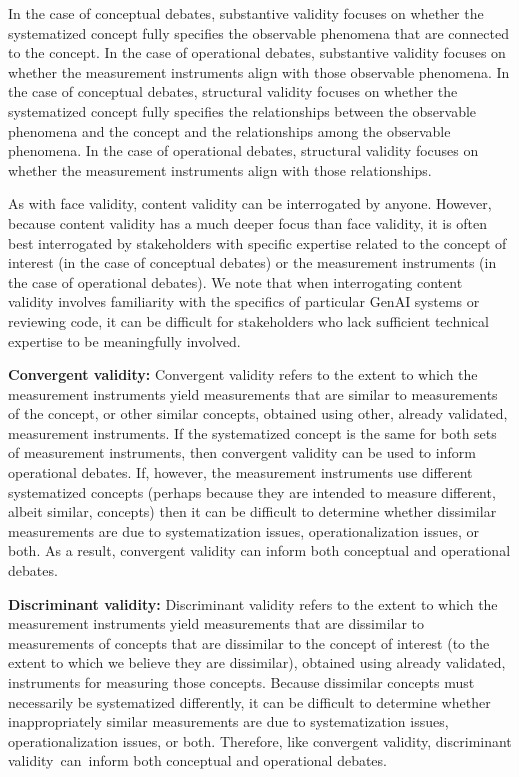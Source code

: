 \documentclass{article}
\begin{document}
In the case of conceptual debates, substantive validity focuses on whether the systematized concept fully specifies the observable phenomena that are connected to the concept. In the case of operational debates, substantive validity focuses on whether the measurement instruments align with those observable phenomena. In the case of conceptual debates, structural validity focuses on whether the systematized concept fully specifies the relationships between the observable phenomena and the concept and the relationships among the observable phenomena. In the case of operational debates, structural validity focuses on whether the measurement instruments align with those relationships.

As with face validity, content validity can be interrogated by anyone. However, because content validity has a much deeper focus than face validity, it is often best interrogated by stakeholders with specific expertise related to the concept of interest (in the case of conceptual debates) or the measurement instruments (in the case of operational debates). We note that when interrogating content validity involves familiarity with the specifics of particular GenAI systems or reviewing code, it can be difficult for stakeholders who lack sufficient technical expertise to be meaningfully involved.

\textbf{Convergent validity:} Convergent validity refers to the extent to which the measurement instruments yield measurements that are similar to measurements of the concept, or other similar concepts, obtained using other, already validated, measurement instruments. If the systematized concept is the same for both sets of measurement instruments, then convergent validity can be used to inform operational debates. If, however, the measurement instruments use different systematized concepts (perhaps because they are intended to measure different, albeit similar, concepts) then it can be difficult to determine whether dissimilar measurements are due to systematization issues, operationalization issues, or both. As a result, convergent validity can inform both conceptual and operational debates.

\textbf{Discriminant validity:} 
Discriminant validity refers to the extent to which the measurement instruments yield measurements that are dissimilar to measurements of concepts that are dissimilar to the concept of interest (to the extent to which we believe they are dissimilar), obtained using already validated, instruments for measuring those concepts. Because dissimilar concepts must necessarily be systematized differently, it can be difficult to determine whether inappropriately similar measurements are due to systematization issues, operationalization issues, or both. Therefore, like convergent validity, discriminant validity~can~inform both conceptual and operational debates.
\end{document}
